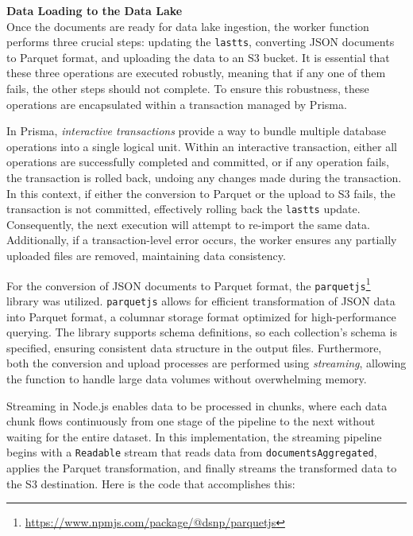 \textbf{Data Loading to the Data Lake} \\
Once the documents are ready for data lake ingestion, the worker function performs three crucial steps: updating the \texttt{lastts}, converting \ac{JSON} documents to Parquet format, and uploading the data to an \ac{S3} bucket. It is essential that these three operations are executed robustly, meaning that if any one of them fails, the other steps should not complete. To ensure this robustness, these operations are encapsulated within a transaction managed by Prisma.

In Prisma, \textit{interactive transactions} provide a way to bundle multiple database operations into a single logical unit. Within an interactive transaction, either all operations are successfully completed and committed, or if any operation fails, the transaction is rolled back, undoing any changes made during the transaction. In this context, if either the conversion to Parquet or the upload to \ac{S3} fails, the transaction is not committed, effectively rolling back the \texttt{lastts} update. Consequently, the next execution will attempt to re-import the same data. Additionally, if a transaction-level error occurs, the worker ensures any partially uploaded files are removed, maintaining data consistency.

For the conversion of \ac{JSON} documents to Parquet format, the \texttt{parquetjs}\footnote{\url{https://www.npmjs.com/package/@dsnp/parquetjs}} library was utilized. \texttt{parquetjs} allows for efficient transformation of \ac{JSON} data into Parquet format, a columnar storage format optimized for high-performance querying. The library supports schema definitions, so each collection's schema is specified, ensuring consistent data structure in the output files. Furthermore, both the conversion and upload processes are performed using \textit{streaming}, allowing the function to handle large data volumes without overwhelming memory.

Streaming in Node.js enables data to be processed in chunks, where each data chunk flows continuously from one stage of the pipeline to the next without waiting for the entire dataset. In this implementation, the streaming pipeline begins with a \texttt{Readable} stream that reads data from \texttt{documentsAggregated}, applies the Parquet transformation, and finally streams the transformed data to the \ac{S3} destination. Here is the code that accomplishes this:

